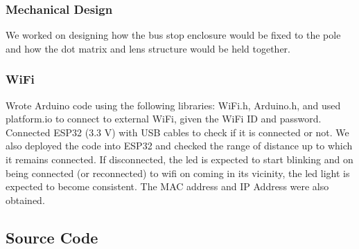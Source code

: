 \documentclass[12pt]{article} %
\begin{document}
\subsubsection{Mechanical Design}
We worked on designing how the bus stop enclosure would be fixed to the pole and how the dot matrix and lens structure would be held together.

\subsubsection{WiFi}
Wrote Arduino code using the following libraries: WiFi.h, Arduino.h, and used platform.io to connect to external WiFi, given the WiFi ID and password. Connected ESP32 (3.3 V) with USB cables to check if it is connected or not. 
We also deployed the code into ESP32 and checked the range of distance up to which it remains connected. If disconnected, the led is expected to start blinking and on being connected (or reconnected) to wifi on coming in its vicinity, the led light is expected to become consistent. The MAC address and IP Address were also obtained.
\clearpage
\subsection{Source Code}
\end{document}
